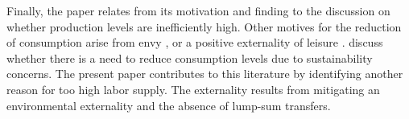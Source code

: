 Finally, the paper relates from its motivation and finding to the discussion on whether production levels are inefficiently high. 
Other motives for the reduction of consumption arise from
envy \cite{Alvarez-Cuadrado2007EnvyHours}, or a positive externality of leisure \cite{Alesina2005WorkDifferent}. \cite{Arrow2004AreMuch} discuss whether there is a need to reduce consumption levels due to sustainability concerns. 
 The present paper contributes to this literature by identifying another reason for too high labor supply. The externality results from mitigating an environmental externality and the absence of lump-sum transfers.
